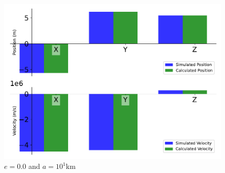 \begin{figure}[htbp]\centerline{\includegraphics[height=0.7\textwidth, keepaspectratio]{AutoTeX/IncCirc_2}}\caption{$e = 0.0$ and $a = 10^1$km}\label{fig:IncCirc_2}\end{figure}